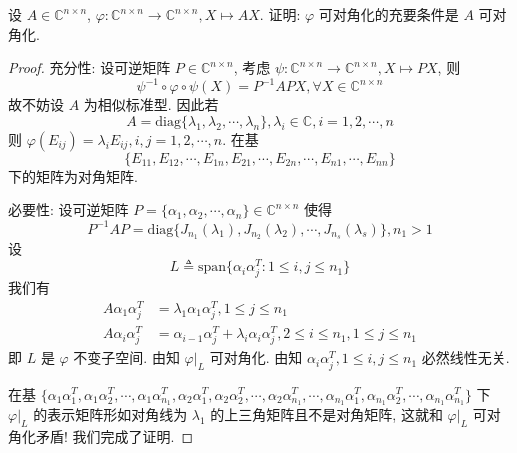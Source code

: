 \documentclass[../../main.tex]{subfiles}
\begin{document}
\begin{example}
设 $A \in \mathbb{C}^{n \times n}$, $\varphi : \mathbb{C}^{n \times n} \to \mathbb{C}^{n \times n}, X \mapsto AX$. 证明: $\varphi$ 可对角化的充要条件是 $A$ 可对角化.
\end{example}
\begin{proof}
{\heiti 充分性:}
设可逆矩阵 $P \in \mathbb{C}^{n \times n}$, 考虑 $\psi : \mathbb{C}^{n \times n} \to \mathbb{C}^{n \times n}, X \mapsto PX$, 则
$$\psi^{-1} \circ \varphi \circ \psi (X) = P^{-1}APX, \forall X \in \mathbb{C}^{n \times n}$$
故不妨设 $A$ 为相似标准型. 因此若
$$A = \mathrm{diag}\{\lambda_1, \lambda_2, \cdots, \lambda_n\}, \lambda_i \in \mathbb{C}, i = 1, 2, \cdots, n$$
则 $\varphi(E_{ij}) = \lambda_i E_{ij}, i, j = 1, 2, \cdots, n$. 在基
$$\{E_{11}, E_{12}, \cdots, E_{1n}, E_{21}, \cdots, E_{2n}, \cdots, E_{n1}, \cdots, E_{nn}\}$$
下的矩阵为对角矩阵.

{\heiti 必要性:}
设可逆矩阵 $P = \{\alpha_1, \alpha_2, \cdots, \alpha_n\} \in \mathbb{C}^{n \times n}$ 使得
$$P^{-1}AP = \mathrm{diag}\{J_{n_1}(\lambda_1), J_{n_2}(\lambda_2), \cdots, J_{n_s}(\lambda_s)\}, n_1 > 1$$
设
$$L \triangleq \mathrm{span}\{\alpha_i \alpha_j^T : 1 \leqslant  i, j \leqslant  n_1\}$$
我们有
\begin{align*}
A\alpha_1 \alpha_j^T &= \lambda_1 \alpha_1 \alpha_j^T, 1 \leqslant  j \leqslant  n_1 \\
A\alpha_i \alpha_j^T &= \alpha_{i - 1} \alpha_j^T + \lambda_i \alpha_i \alpha_j^T, 2 \leqslant  i \leqslant  n_1, 1 \leqslant  j \leqslant  n_1
\end{align*}
即 $L$ 是 $\varphi$ 不变子空间. 由知 $\varphi|_L$ 可对角化. 由知 $\alpha_i \alpha_j^T, 1 \leqslant  i, j \leqslant  n_1$ 必然线性无关.

在基 $\{\alpha_1 \alpha_1^T, \alpha_1 \alpha_2^T, \cdots, \alpha_1 \alpha_{n_1}^T, \alpha_2 \alpha_1^T, \alpha_2 \alpha_2^T, \cdots, \alpha_2 \alpha_{n_1}^T, \cdots, \alpha_{n_1} \alpha_1^T, \alpha_{n_1} \alpha_2^T, \cdots, \alpha_{n_1} \alpha_{n_1}^T\}$ 下 $\varphi|_L$ 的表示矩阵形如对角线为 $\lambda_1$ 的上三角矩阵且不是对角矩阵, 这就和 $\varphi|_L$ 可对角化矛盾! 我们完成了证明.
\end{proof}
\end{document}
